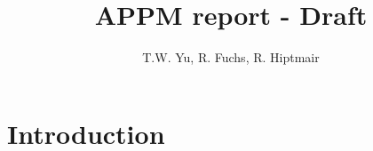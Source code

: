 \documentclass{report}
\title{APPM report - Draft}
\author{T.W. Yu, R. Fuchs, R. Hiptmair}
\begin{document}
\maketitle

\chapter{Introduction}
\end{document}
